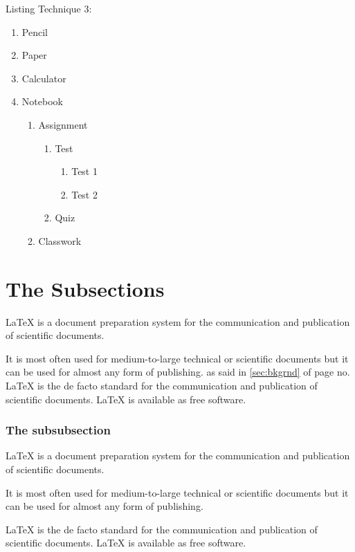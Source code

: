 Listing Technique 3:
\vspace{-18pt}
\renewcommand{\labelenumii}{\Alph{enumii}}
\renewcommand{\labelenumiii}{\Roman{enumiii}}
\renewcommand{\labelenumiv}{\roman{enumiv}}
\begin{enumerate}
\item Pencil
\item Paper
\item Calculator
\item Notebook
	\begin{enumerate}
	\item Assignment
		\begin{enumerate}
		\item Test
			\begin{enumerate}
			\item Test 1
			\item Test 2
			\end{enumerate}
		\item Quiz
		\end{enumerate}
	\item Classwork
	\end{enumerate}
\end{enumerate}

\section{The Subsections}

LaTeX  is a document preparation system for the communication and publication of scientific documents. \par It is most often used for medium-to-large technical or scientific documents but it can be used for almost any form of publishing.
as said in \ref{sec:bkgrnd} of page no. \pageref{sec:bkgrnd}
LaTeX is the de facto standard for the communication and publication of scientific documents. LaTeX is available as free software.

\subsubsection{The subsubsection}
LaTeX  is a document preparation system for the communication and publication of scientific documents. \par It is most often used for medium-to-large technical or scientific documents but it can be used for almost any form of publishing.

LaTeX is the de facto standard for the communication and publication of scientific documents. LaTeX is available as free software.

